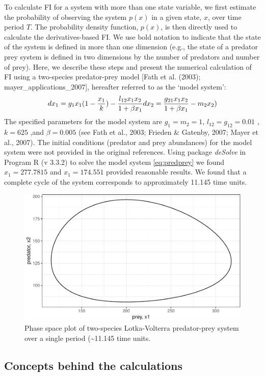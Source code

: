 \documentclass[12pt,twoside,openany]{reedthesis}
\begin{document}
To calculate FI for a system with more than one state variable, we first estimate the probability of observing the system \(p(x)\) in a given state, \(x\), over time period \(T\). The probability density function, \(p(x)\), is then directly used to calculate the derivatives-based FI. We use bold notation to indicate that the state of the system is defined in more than one dimension (e.g., the state of a predator prey system is defined in two dimensions by the number of predators and number of prey). Here, we describe these steps and present the numerical calculation of FI using a two-species predator-prey model {[}Fath et al. (2003); mayer\_applications\_2007{]}, hereafter referred to as the `model system':
\begin{equation} 
  dx_1 = g_{1}x_{1}(1-\frac{x_1}{k})- \frac{l_{12} x_{1} x_{2}}{1+\beta x_{1}} \\
  dx_2 = \frac{g_{21}x_1 x_2}{1+\beta x_1} - m_2 x_2)
  \label{eq:predprey}
\end{equation}
The specified parameters for the model system are \(g_1=m_2=1\), \(l_12=g_12 = 0.01\) , \(k=625\) ,and \(\beta=0.005\) (see Fath et al., 2003; Frieden \& Gatenby, 2007; Mayer et al., 2007). The initial conditions (predator and prey abundances) for the model system were not provided in the original references. Using package \emph{deSolve} in Program R (v 3.3.2) to solve the model system \eqref{eq:predprey} we found \(x_1 = 277.7815\) and \(x_1= 174.551\) provided reasonable results. We found that a complete cycle of the system corresponds to approximately 11.145 time units.
\begin{figure}
\centering
\includegraphics{_myDissertation_files/figure-latex/pp1Period-1.pdf}
\caption{\label{fig:pp1Period}Phase space plot of two-species Lotka-Volterra predator-prey system over a single period (\textasciitilde{}11.145 time units.}
\end{figure}
\hypertarget{concepts-behind-the-calculations}{%
\subsection{Concepts behind the calculations}\label{concepts-behind-the-calculations}}
\end{document}
